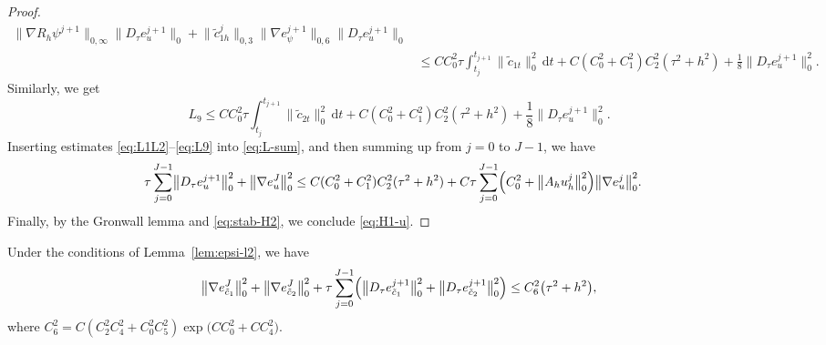 \begin{proof}
\begin{align}
    \bigl\|\nabla R_{h}\psi^{j+1}\bigr\|_{0,\infty}
    \bigl\|D_{\tau}e_{u}^{j+1}\bigr\|_{0}
  + \bigl\|\tilde{c}_{1h}^{j}\bigr\|_{0,3}
    \bigl\|\nabla e_{\psi}^{j+1}\bigr\|_{0,6}
    \bigl\|D_{\tau}e_{u}^{j+1}\bigr\|_{0}
  \nonumber\\
  &\leq CC_{0}^{2}\tau\int_{t_{j}}^{t_{j+1}}\|\tilde{c}_{1t}\|_{0}^{2}\,\mathrm{d}t
    + C(C_{0}^{2}+C_{1}^{2})C_{2}^{2}(\tau^{2}+h^{2})
    + \frac{1}{8}\bigl\|D_{\tau}e_{u}^{j+1}\bigr\|_{0}^{2}.
  \label{eq:L8}
\end{align}
Similarly, we get
\begin{equation}\label{eq:L9}
  L_{9} \leq CC_{0}^{2}\tau\int_{t_{j}}^{t_{j+1}}\|\tilde{c}_{2t}\|_{0}^{2}\,\mathrm{d}t
           + C(C_{0}^{2}+C_{1}^{2})C_{2}^{2}(\tau^{2}+h^{2})
           + \frac{1}{8}\bigl\|D_{\tau}e_{u}^{j+1}\bigr\|_{0}^{2}.
\end{equation}
Inserting estimates \eqref{eq:L1L2}--\eqref{eq:L9} into \eqref{eq:L-sum}, and then summing up
from $j = 0$ to $J-1$, we have
\begin{align}
  \tau\sum_{j=0}^{J-1}\bigl\|D_{\tau}e_{u}^{j+1}\bigr\|_{0}^{2}
  + \bigl\|\nabla e_{u}^{J}\bigr\|_{0}^{2}
  &\leq C(C_{0}^{2}+C_{1}^{2})C_{2}^{2}(\tau^{2}+h^{2})
   + C\tau\sum_{j=0}^{J-1}\Bigl(C_{0}^{2}
                                 + \bigl\|A_{h}u_{h}^{j}\bigr\|_{0}^{2}\Bigr)
    \bigl\|\nabla e_{u}^{j}\bigr\|_{0}^{2}.
  \label{eq:H1-u-pre}
\end{align}
Finally, by the Gronwall lemma and \eqref{eq:stab-H2}, we conclude \eqref{eq:H1-u}.
\end{proof}

\begin{theorem}\label{thm:H1-c}
Under the conditions of Lemma~\ref{lem:epsi-l2}, we have
\begin{equation}\label{eq:H1-c}
  \bigl\|\nabla e_{\tilde{c}_{1}}^{J}\bigr\|_{0}^{2}
  + \bigl\|\nabla e_{\tilde{c}_{2}}^{J}\bigr\|_{0}^{2}
  + \tau\sum_{j=0}^{J-1}\Bigl(\bigl\|D_{\tau}e_{\tilde{c}_{1}}^{j+1}\bigr\|_{0}^{2}
                              + \bigl\|D_{\tau}e_{\tilde{c}_{2}}^{j+1}\bigr\|_{0}^{2}\Bigr)
  \leq C_{6}^{2}\bigl(\tau^{2} + h^{2}\bigr),
\end{equation}
where $C_{6}^{2} = C(C_{2}^{2}C_{4}^{2} + C_{0}^{2}C_{5}^{2})
\exp\!\bigl(CC_{0}^{2} + CC_{4}^{2}\bigr)$.
\end{theorem}

